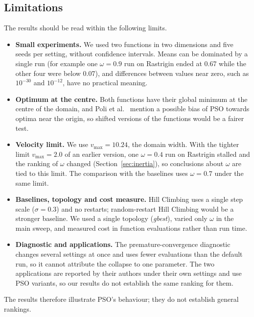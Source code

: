 \documentclass[11pt,a4paper]{article}
\newcommand{\vmax}{v_{\max}}
\newcommand{\tn}[1]{\textit{#1}}
\begin{document}
\subsection{Limitations}\label{sec:limitations}
The results should be read within the following limits.
\begin{itemize}
\item \textbf{Small experiments.} We used two functions in two dimensions and five seeds per setting, without confidence intervals. Means can be dominated by a single run (for example one $\omega=0.9$ run on Rastrigin ended at 0.67 while the other four were below 0.07), and differences between values near zero, such as $10^{-30}$ and $10^{-12}$, have no practical meaning.
\item \textbf{Optimum at the centre.} Both functions have their global minimum at the centre of the domain, and Poli et al.~\cite[Sect.~7.1]{poli2007} mention a possible bias of PSO towards optima near the origin, so shifted versions of the functions would be a fairer test.
\item \textbf{Velocity limit.} We use $\vmax=10.24$, the domain width. With the tighter limit $\vmax=2.0$ of an earlier version, one $\omega=0.4$ run on Rastrigin stalled and the ranking of $\omega$ changed (Section~\ref{sec:inertia}), so conclusions about $\omega$ are tied to this limit. The comparison with the baselines uses $\omega=0.7$ under the same limit.
\item \textbf{Baselines, topology and cost measure.} Hill Climbing uses a single step scale ($\sigma=0.3$) and no restarts; random-restart Hill Climbing would be a stronger baseline. We used a single topology (\tn{gbest}), varied only $\omega$ in the main sweep, and measured cost in function evaluations rather than run time.
\item \textbf{Diagnostic and applications.} The premature-convergence diagnostic changes several settings at once and uses fewer evaluations than the default run, so it cannot attribute the collapse to one parameter. The two applications are reported by their authors under their own settings and use PSO variants, so our results do not establish the same ranking for them.
\end{itemize}
The results therefore illustrate PSO's behaviour; they do not establish general rankings.

\end{document}
